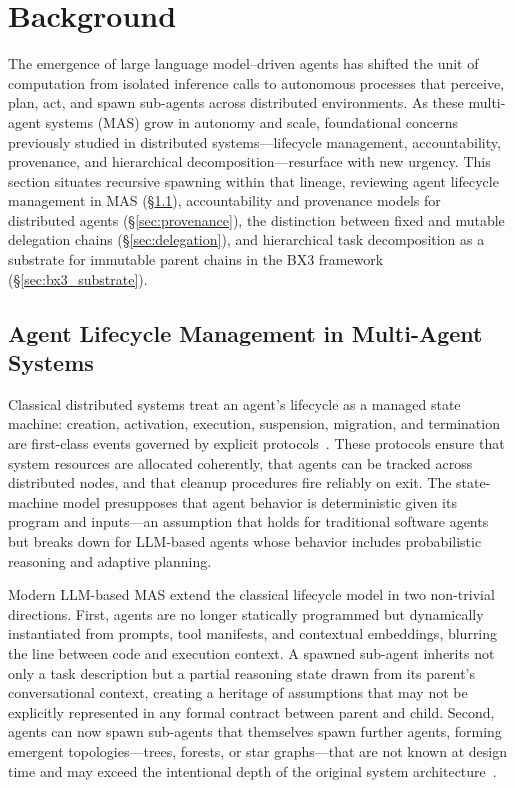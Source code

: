 \section{Background}
\label{sec:background}

The emergence of large language model--driven agents has shifted the unit of computation from isolated inference calls to autonomous processes that perceive, plan, act, and spawn sub-agents across distributed environments. As these multi-agent systems (MAS) grow in autonomy and scale, foundational concerns previously studied in distributed systems---lifecycle management, accountability, provenance, and hierarchical decomposition---resurface with new urgency. This section situates recursive spawning within that lineage, reviewing agent lifecycle management in MAS (\S\ref{sec:lifecycle}), accountability and provenance models for distributed agents (\S\ref{sec:provenance}), the distinction between fixed and mutable delegation chains (\S\ref{sec:delegation}), and hierarchical task decomposition as a substrate for immutable parent chains in the BX3 framework (\S\ref{sec:bx3_substrate}).

\subsection{Agent Lifecycle Management in Multi-Agent Systems}
\label{sec:lifecycle}

Classical distributed systems treat an agent's lifecycle as a managed state machine: creation, activation, execution, suspension, migration, and termination are first-class events governed by explicit protocols~\cite{ferrarotti2022lifecycle}. These protocols ensure that system resources are allocated coherently, that agents can be tracked across distributed nodes, and that cleanup procedures fire reliably on exit. The state-machine model presupposes that agent behavior is deterministic given its program and inputs---an assumption that holds for traditional software agents but breaks down for LLM-based agents whose behavior includes probabilistic reasoning and adaptive planning.

Modern LLM-based MAS extend the classical lifecycle model in two non-trivial directions. First, agents are no longer statically programmed but dynamically instantiated from prompts, tool manifests, and contextual embeddings, blurring the line between code and execution context. A spawned sub-agent inherits not only a task description but a partial reasoning state drawn from its parent's conversational context, creating a heritage of assumptions that may not be explicitly represented in any formal contract between parent and child. Second, agents can now spawn sub-agents that themselves spawn further agents, forming emergent topologies---trees, forests, or star graphs---that are not known at design time and may exceed the intentional depth of the original system architecture~\cite{agenthive2025}.

